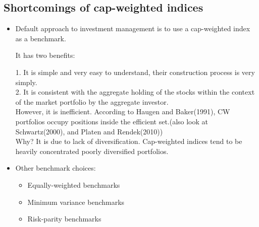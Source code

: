 \documentclass{maths}
\begin{document}
\subsection{Shortcomings of cap-weighted indices}
\begin{itemize}
\item Default approach to
investment management is to use a cap-weighted index as a benchmark.

It has two benefits: 

1. It is simple and very easy to understand, their construction process is very simply.\\
2. It is  consistent with the aggregate holding of the stocks within the context of the market portfolio by the aggregate investor.\\

However, it is inefficient. According to Haugen and Baker(1991), CW portfolios occupy positions inside the efficient set.(also look at Schwartz(2000), and Platen and Rendek(2010))\\

Why? It is due to lack of diversification. Cap-weighted indices tend to be heavily concentrated poorly diversified portfolios. 
\item Other benchmark choices:
\begin{itemize}
\item Equally-weighted benchmarks
\item Minimum variance benchmarks
\item Risk-parity benchmarks
\end{itemize}



\end{itemize}
\end{document}
